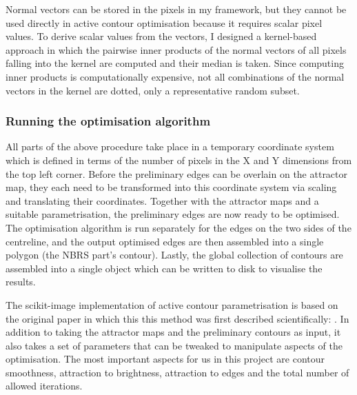 Normal vectors can be stored in the pixels in my framework, but they cannot be used directly in active contour optimisation because it requires scalar pixel values. To derive scalar values from the vectors, I designed a kernel-based approach in which the pairwise inner products of the normal vectors of all pixels falling into the kernel are computed and their median is taken. Since computing inner products is computationally expensive, not all combinations of the normal vectors in the kernel are dotted, only a representative random subset.

\subsubsection{Running the optimisation algorithm}

All parts of the above procedure take place in a temporary coordinate system which is defined in terms of the number of pixels in the X and Y dimensions from the top left corner. Before the preliminary edges can be overlain on the attractor map, they each need to be transformed into this coordinate system via scaling and translating their coordinates. Together with the attractor maps and a suitable parametrisation, the preliminary edges are now ready to be optimised. The optimisation algorithm is run separately for the edges on the two sides of the centreline, and the output optimised edges are then assembled into a single polygon (the NBRS part's contour). Lastly, the global collection of contours are assembled into a single object which can be written to disk to visualise the results.

The scikit-image implementation of active contour parametrisation is based on the original paper in which this this method was first described scientifically: \cite{kass_etal_1988}. In addition to taking the attractor maps and the preliminary contours as input, it also takes a set of parameters that can be tweaked to manipulate aspects of the optimisation. The most important aspects for us in this project are contour smoothness, attraction to brightness, attraction to edges and the total number of allowed iterations.


